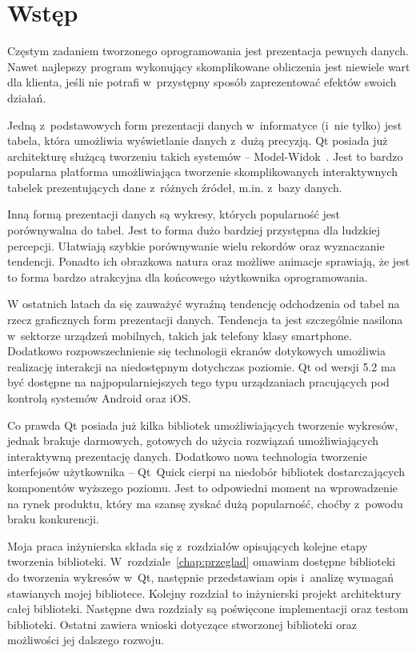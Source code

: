 \chapter*{Wstęp}
Częstym zadaniem tworzonego oprogramowania jest prezentacja pewnych danych. Nawet najlepszy program wykonujący skomplikowane obliczenia jest niewiele wart dla klienta, jeśli nie potrafi w~przystępny sposób zaprezentować efektów swoich działań.
 
Jedną z~podstawowych form prezentacji danych w~informatyce (i~nie tylko) jest tabela, która umożliwia wyświetlanie danych z~dużą precyzją. Qt posiada już architekturę służącą tworzeniu takich systemów -- Model-Widok~\cite{Qt:Model:View}. Jest to bardzo popularna platforma umożliwiająca tworzenie skomplikowanych interaktywnych tabelek prezentujących dane z~różnych źródeł, m.in. z~bazy danych.

Inną formą prezentacji danych są wykresy, których popularność jest porównywalna do tabel. Jest to forma dużo bardziej przystępna dla ludzkiej percepcji. Ułatwiają szybkie porównywanie wielu rekordów oraz wyznaczanie tendencji. Ponadto ich obrazkowa natura oraz możliwe animacje sprawiają, że jest to forma bardzo atrakcyjna dla końcowego użytkownika oprogramowania.

W ostatnich latach da się zauważyć wyraźną tendencję odchodzenia od tabel na rzecz graficznych form prezentacji danych. Tendencja ta jest szczególnie nasilona w~sektorze urządzeń mobilnych, takich jak telefony klasy smartphone. Dodatkowo rozpowszechnienie się technologii ekranów dotykowych umożliwia realizację interakcji na niedostępnym dotychczas poziomie. Qt od wersji 5.2 ma być dostępne na najpopularniejszych tego typu urządzaniach pracujących pod kontrolą systemów Android oraz iOS. 

Co prawda Qt posiada już kilka bibliotek umożliwiających tworzenie wykresów, jednak brakuje darmowych, gotowych do użycia rozwiązań umożliwiających interaktywną prezentację danych. Dodatkowo nowa technologia tworzenie interfejsów użytkownika -- Qt~Quick cierpi na niedobór bibliotek dostarczających komponentów wyższego poziomu. Jest to odpowiedni moment na wprowadzenie na rynek produktu, który ma szansę zyskać dużą popularność, choćby z~powodu braku konkurencji.

Moja praca inżynierska składa się z~rozdziałów opisujących kolejne etapy tworzenia biblioteki. W~rozdziale~\ref{chap:przeglad} omawiam dostępne biblioteki do tworzenia wykresów w~Qt, następnie przedstawiam opis i~analizę wymagań stawianych mojej bibliotece. Kolejny rozdział to inżynierski projekt architektury całej biblioteki. Następne dwa rozdziały są poświęcone implementacji oraz testom biblioteki. Ostatni  zawiera wnioski dotyczące stworzonej biblioteki oraz możliwości jej dalszego rozwoju. 

